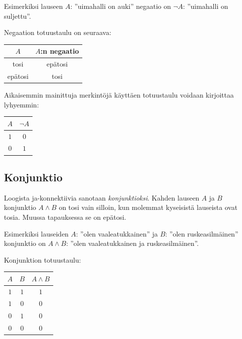 Esimerkiksi lauseen $A$: ''uimahalli on auki'' negaatio on $\lnot A$: ''uimahalli on suljettu''.

Negaation totuustaulu on seuraava:


\bigskip

\begin{center}
\begin{tabular}{|c|c|}\hline
$A$ & $A$:n negaatio \\ \hline
tosi & epätosi \\ 
epätosi & tosi \\
\hline
\end{tabular}
\end{center}

\bigskip

Aikaisemmin mainittuja merkintöjä käyttäen totuustaulu voidaan kirjoittaa lyhyemmin:

\bigskip

\begin{center}
\begin{tabular}{|c|c|}\hline
$A$ & $\lnot A$ \\ \hline
$1$ & $0$\\ 
$0$ & $1$ \\ \hline
\end{tabular}
\end{center}

\bigskip

\subsection*{Konjunktio}
Loogista ja-konnektiivia sanotaan {\em konjunktioksi}. Kahden lauseen $A$ ja $B$ konjunktio $A\land B$ on tosi vain silloin, kun molemmat kyseisistä lauseista ovat tosia. Muussa tapauksessa se on epätosi.

Esimerkiksi lauseiden $A$: ''olen vaaleatukkainen'' ja $B$: ''olen ruskeasilmäinen'' konjunktio on $A \land B$: ''olen vaaleatukkainen ja ruskeasilmäinen''. 

Konjunktion totuustaulu:

\bigskip

\begin{center}
\begin{tabular}{|c|c|c|}\hline
$A$ & $B$ & $A\land B$ \\ \hline
$1$ & $1$ & $1$\\ 
$1$ & $0$ & $0$\\
$0$ & $1$ & $0$\\
$0$ & $0$ & $0$\\
\hline
\end{tabular}
\end{center}

